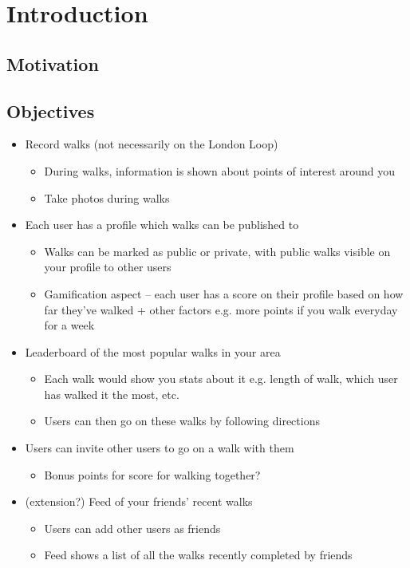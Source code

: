 \chapter{Introduction}

\section{Motivation}

\section{Objectives} \label{section:objectives}

\begin{itemize}
    \item Record walks (not necessarily on the London Loop)
    \begin{itemize}
        \item During walks, information is shown about points of interest around you
        \item Take photos during walks
    \end{itemize}
    \item Each user has a profile which walks can be published to
    \begin{itemize}
        \item Walks can be marked as public or private, with public walks visible on your profile to other users
        \item Gamification aspect – each user has a score on their profile based on how far they’ve walked + other factors e.g. more points if you walk everyday for a week
    \end{itemize}
    \item Leaderboard of the most popular walks in your area
    \begin{itemize}
        \item Each walk would show you stats about it e.g. length of walk, which user has walked it the most, etc.
        \item Users can then go on these walks by following directions
    \end{itemize}
    \item Users can invite other users to go on a walk with them
    \begin{itemize}
        \item Bonus points for score for walking together?
    \end{itemize}
    \item (extension?) Feed of your friends’ recent walks
    \begin{itemize}
        \item Users can add other users as friends
        \item Feed shows a list of all the walks recently completed by friends
    \end{itemize}
\end{itemize}

